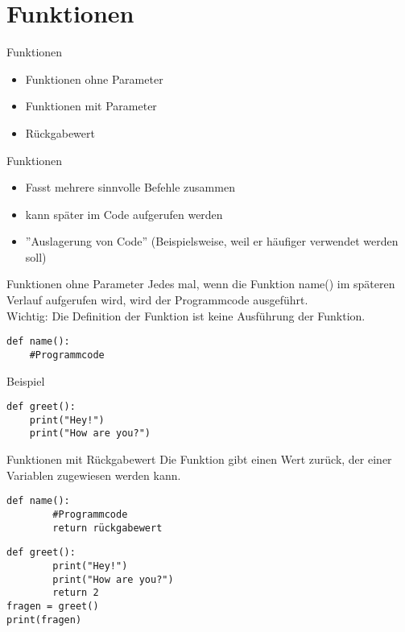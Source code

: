 \section{Funktionen}
\begin{frame}[fragile]{Funktionen}
\begin{itemize}
	\item Funktionen ohne Parameter
	\item Funktionen mit Parameter
	\item Rückgabewert 
\end{itemize}
\end{frame}

\begin{frame}[fragile]{Funktionen}
	\begin{itemize}
		\item Fasst mehrere sinnvolle Befehle zusammen
		\item kann später im Code aufgerufen werden
		\item ''Auslagerung von Code'' (Beispielsweise, weil er häufiger verwendet werden soll)
	\end{itemize}
\end{frame}

\begin{frame}[fragile]{Funktionen ohne Parameter}
Jedes mal, wenn die Funktion name() im späteren Verlauf aufgerufen wird, wird der Programmcode ausgeführt. \\
Wichtig: Die Definition der Funktion ist keine Ausführung der Funktion.
\begin{lstlisting}
def name():
	#Programmcode
\end{lstlisting}

Beispiel
\begin{lstlisting}
def greet():
    print("Hey!")
    print("How are you?")
\end{lstlisting}
\end{frame}

\begin{frame}[fragile]{Funktionen mit Rückgabewert}
Die Funktion gibt einen Wert zurück, der einer Variablen zugewiesen werden kann.
\begin{lstlisting}
def name():
		#Programmcode
		return rückgabewert
\end{lstlisting}

\begin{lstlisting}
def greet():
		print("Hey!")
		print("How are you?")
		return 2
fragen = greet()
print(fragen)
\end{lstlisting}
\end{frame}


